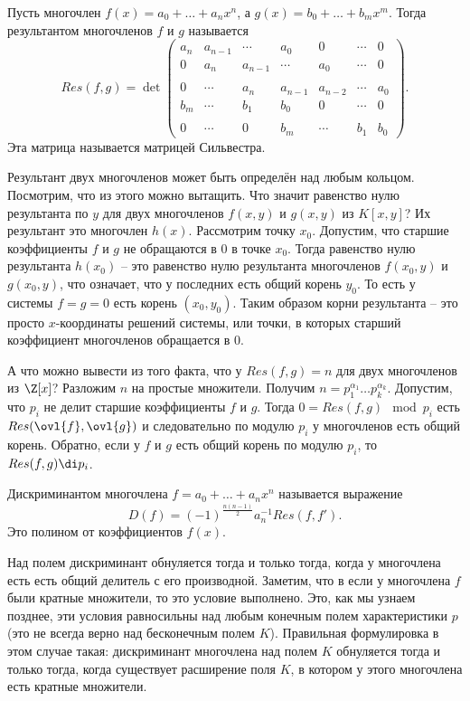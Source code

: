 \dfn Пусть многочлен $f(x)=a_0+\dots+a_nx^n$, а $g(x)=b_0+\dots+b_mx^m$. Тогда результантом многочленов $f$ и $g$ называется $$Res(f,g)=  \det 
\begin{pmatrix}
a_n & a_{n-1} & \cdots & a_0 & 0 & \cdots & 0 \\
0 & a_n & a_{n-1} & \cdots & a_0 & \cdots & 0 \\
\\
0 & \cdots &  a_n & a_{n-1} & a_{n-2} & \cdots &  a_0 \\
b_m & \cdots & b_1 & b_0 & 0 & \cdots & 0 \\
 \\
0 & \cdots & 0 & b_m & \cdots & b_1 & b_0 
\end{pmatrix}.$$
Эта матрица называется матрицей Сильвестра. 
\edfn

Результант двух многочленов может быть определён над любым кольцом. Посмотрим, что из этого можно вытащить. Что значит равенство нулю результанта по $y$ для двух многочленов $f(x,y) $ и $g(x,y)$ из $K[x,y]$? Их результант это многочлен $h(x)$. Рассмотрим точку $x_0$. Допустим, что старшие коэффициенты $f$ и $g$ не обращаются в 0 в точке $x_0$. Тогда равенство нулю результанта $h(x_0)$ -- это равенство нулю результанта многочленов $f(x_0,y)$ и $g(x_0,y)$, что означает, что у последних есть общий корень $y_0$. То есть у системы $f=g=0$ есть корень $(x_0,y_0)$. Таким образом корни результанта -- это  просто $x$-координаты решений системы, или точки, в которых старший коэффициент многочленов обращается в 0.


А что можно вывести из того факта, что у $Res(f,g)=n$ для двух многочленов из $\Z[x]$? Разложим $n$ на простые множители. Получим $n=p_1^{\alpha_1} \dots p_k^{\alpha_k}$. Допустим, что $p_i$ не делит старшие коэффициенты $f$ и $g$. Тогда $0=Res(f,g) \mod p_i $ есть $Res(\ovl{f}, \ovl{g})$ и следовательно по модулю $p_i$ у многочленов есть общий корень. Обратно, если у $f$ и $g$ есть общий корень по модулю $p_i$, то $Res(f,g)\di p_i$.

\dfn Дискриминантом многочлена $f=a_0+\dots +a_nx^n$ называется выражение 
$$D(f)=(-1)^{\frac{n(n-1)}{2}} a_n^{-1} Res(f,f').$$
Это полином от коэффициентов $f(x)$.
\edfn

\rm Над полем  дискриминант обнуляется тогда и только тогда, когда у многочлена есть есть общий делитель с его производной. Заметим, что в если у многочлена $f$ были кратные множители, то это условие выполнено. Это, как мы узнаем позднее, эти условия равносильны над любым конечным полем характеристики $p$ (это не всегда верно над бесконечным полем $K$). Правильная формулировка в этом случае такая: дискриминант многочлена над полем $K$ обнуляется тогда и только тогда, когда существует расширение поля $K$, в котором у этого многочлена есть кратные множители.  
\erm

